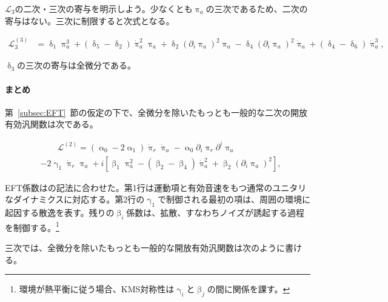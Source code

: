 \documentclass[a4paper,11pt]{ltjsarticle}
\numberwithin{equation}{section}
\newcommand{\Sec}[1]{Sec.~\ref{#1}}
\renewcommand{\Sec}[1]{第~\ref{#1}~節}
\begin{document}
$\mathcal{L}_3$の二次・三次の寄与を明示しよう。少なくとも$\uppi_a$の三次であるため、二次の寄与はない。三次に制限すると次式となる。

\begin{align}
        \mathcal{L}_3^{(3)} &=\updelta_1 \uppi_a^3 + (\updelta_5- \updelta_2)  \dot{\uppi}_{a}^2 \uppi_a  + \updelta_2  (\partial_i \uppi_{a})^2 \uppi_a - \updelta_4  (\partial_i \uppi_{a})^2 \dot{\uppi}_a + (\updelta_4-\updelta_6)\dot{\uppi}_{a}^3 ,
    \end{align}

$\updelta_3$の三次の寄与は全微分である。

\begin{tcolorbox}[enhanced,breakable,skin first=enhanced,skin middle=enhanced,skin last=enhanced,before upper={\parindent15pt},]{}
\paragraph{まとめ}

\Sec{subsec:EFT}の仮定の下で、全微分を除いたもっとも一般的な二次の開放有効汎関数は次である。

\begin{align}\label{eq:L2ref}
    &\qquad \mathcal{L}^{(2)} =\left( \upalpha_0 -2 \upalpha_1\right) \dot{\uppi}_{r} \dot{\uppi}_{a} - \upalpha_0 \partial_i \uppi_{r}  \partial^i \uppi_{a} \nonumber   \\
    &- 2 \upgamma_1  \dot{\uppi}_{r} \uppi_a+i \left[\upbeta_1 \uppi_a^2 - \left(\upbeta_2 - \upbeta_4\right)\dot{\uppi}_a^2 + \upbeta_2 \left(\partial_i \uppi_{a} \right)^2\right],
\end{align}

EFT係数は\cite{Hongo:2018ant}の記法に合わせた。第1行は運動項と有効音速をもつ通常のユニタリなダイナミクスに対応する。第2行の$\upgamma_1$で制御される最初の項は、周囲の環境に起因する散逸を表す。残りの$\upbeta_i$係数は、拡散、すなわちノイズが誘起する過程を制御する。\footnote{環境が熱平衡に従う場合、KMS対称性は$\upgamma_i$と$\upbeta_j$の間に関係を課す\cite{Liu:2018kfw}。}

三次では、全微分を除いたもっとも一般的な開放有効汎関数は次のように書ける。


\end{tcolorbox}
\end{document}
